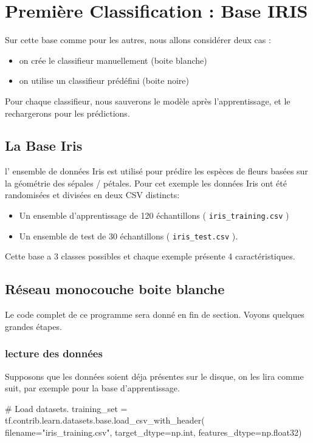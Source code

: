 \documentclass[a4paper,11pt]{book}
\begin{document}
\chapter{Première Classification : Base IRIS}

Sur cette base comme pour les autres, nous allons considérer deux cas :
\begin{itemize}
\item on crée le classifieur manuellement (boite blanche)
\item on utilise un classifieur prédéfini (boite noire)
\end{itemize}

Pour chaque classifieur, nous sauverons le modèle après l'apprentissage, et le rechargerons pour les prédictions.

\section{La Base Iris}

l' ensemble de données Iris est utilisé pour prédire les espèces de fleurs basées sur la géométrie des sépales / pétales. Pour cet exemple  les données Iris ont été randomisées et divisées en deux CSV distincts:
\begin {itemize}
\item Un ensemble d'apprentissage de 120 échantillons ( \verb+iris_training.csv+ )
\item	Un ensemble de test de 30 échantillons ( \verb+iris_test.csv+ ).
\end{itemize}

Cette base a 3 classes possibles et chaque exemple présente 4 caractéristiques.

\section{Réseau monocouche boite blanche}
Le code complet de ce programme sera donné en fin de section. Voyons quelques grandes étapes.

\subsection{lecture des données}
\label{sec:irisMonocoucheRead}
Supposons que les données soient déja présentes sur le disque, on les lira comme suit, par exemple pour la base d'apprentissage.

\begin{mypython}
# Load datasets.
training_set = tf.contrib.learn.datasets.base.load_csv_with_header(
  filename="iris_training.csv",
  target_dtype=np.int,
  features_dtype=np.float32)
\end{mypython}
\end{document}
